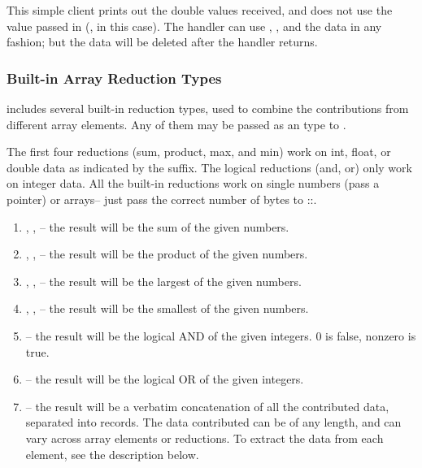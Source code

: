 This simple client prints out the double values received, and does not
use the  value passed in (, in this case).  The
handler can use , , and the data in any
fashion; but the data will be deleted after the handler returns.


\subsubsection{Built-in Array Reduction Types}
\charmpp includes several built-in reduction types, used to combine the contributions from different array elements.  Any of them may be passed as an  type to .

The first four reductions (sum, product, max, and min) work on int,
float, or double data as indicated by the suffix.  The logical
reductions (and, or) only work on integer data.  All the built-in
reductions work on single numbers (pass a pointer) or arrays-- just
pass the correct number of bytes to
::.

\begin{enumerate}
\item {}, , -- the result will be the sum of the given numbers.

\item {}, , -- the result will be the product of the given numbers.

\item {}, , -- the result will be the largest of the given numbers.

\item {}, , -- the result will be the smallest of the given numbers.

\item {}-- the result will be the logical AND of the given integers.  0 is false, nonzero is true.

\item {}-- the result will be the logical OR of the given integers.

\item {}-- the result will be a verbatim concatenation of all the contributed data, separated into  records.  The data contributed can be of any length, and can vary across array elements or reductions.  To extract the data from each element, see the description below.

\end{enumerate}


